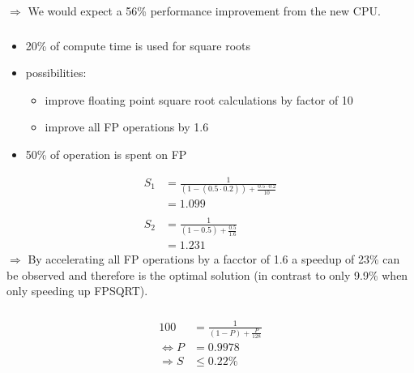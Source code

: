 \documentclass[]{scrartcl}
\begin{document}
$\Rightarrow$ We would expect a 56\% performance improvement from the new CPU\@.

\subsubsection{}
\begin{itemize}
    \item 20\% of compute time is used for square roots
    \item possibilities:
        \begin{itemize}
            \item improve floating point square root calculations by factor of 10
            \item improve all FP operations by 1.6
        \end{itemize}
    \item 50\% of operation is spent on FP
\end{itemize}
\begin{align}
    S_1 &= \frac{1}{(1-(0.5\cdot 0.2))+\frac{0.5\cdot0.2}{10}}\\
        &= 1.099\\\nonumber\\
    S_2 &= \frac{1}{(1-0.5)+\frac{0.5}{1.6}}\\
        &= 1.231
\end{align}
$\Rightarrow$ By accelerating all FP operations by a facctor of 1.6 a speedup of 23\% can be observed and therefore is the optimal solution (in contrast to only 9.9\% when only speeding up FPSQRT).

\subsubsection{}
\begin{align}
    100 &= \frac{1}{(1-P)+\frac{P}{128}}\\
    \Leftrightarrow P&= 0.9978\\
    \Rightarrow S &\leq 0.22\%
\end{align}
\end{document}
